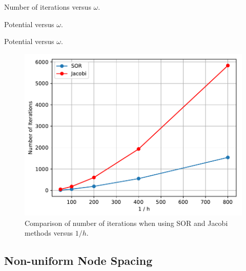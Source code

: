 \documentclass[a4paper,titlepage]{article}
\begin{document}
	\begin{table}[!htb]
		\centering
		\caption{Number of iterations versus $\omega$.}
		\label{tabel:q3d_iterations}
	\end{table}
	
	\begin{table}[!htb]
		\centering
		\caption{Potential versus $\omega$.}
		\label{tabel:q3d_potential}
	\end{table}

	\begin{table}[!htb]
	\centering
	\caption{Potential versus $\omega$.}
	\label{tabel:q3d_iterations_comparison}
	\end{table}

	\begin{figure}[!htb]
	\centering
	\includegraphics[width=\columnwidth]{plots/q3d_iterations_comparison.pdf}
	\caption
	{Comparison of number of iterations when using SOR and Jacobi methods versus $1/h$.}
	\label{fig:q3d_iterations_comparison}
	\end{figure}
	
	\subsection{Non-uniform Node Spacing}
\end{document}
